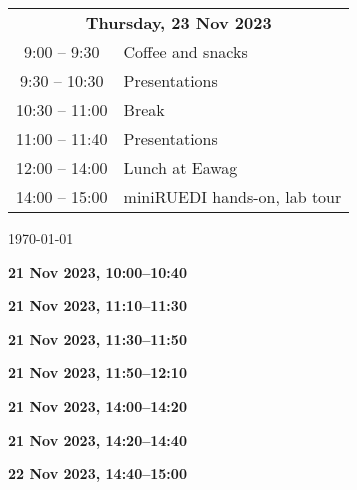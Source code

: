 \documentclass[12pt]{extbook}
\renewcommand{\dateseparator}{--}
\newcommand{\breaktime}[1]{
\bigskip
\begin{center}
\Large\bfseries ***** Break #1 *****
\end{center}
\bigskip}
\renewcommand{\breaktime}[1]{}
\newcommand{\abstract}[2]{{
\bigskip
\begin{center}
\large\bfseries #1
\end{center}}
\par

\clearpage
}
\begin{document}
\begin{center}
\begin{tabular}{c@{\hskip 0.5in}l}
\multicolumn{2}{c}{\bf Thursday, 23 Nov 2023}\\[2ex]
\phantom{1}9:00  -- \phantom{1}9:30	  &	Coffee and snacks\\
\phantom{1}9:30  -- 10:30	&	Presentations\\   %
10:30 -- 11:00	&	Break\\
11:00 -- 11:40	& Presentations\\   %
12:00 -- 14:00	&	Lunch at Eawag\\
14:00 -- 15:00	&	miniRUEDI hands-on, lab tour\\[1.5ex]

\end{tabular}

\enlargethispage{2cm}
\vfill
\renewcommand{\dateseparator}{--}
{\hfill \tiny \today}

\end{center}

\clearpage






\abstract{21 Nov 2023, 10:00--10:40}{abstracts/Giroud} %

\breaktime{30 min}

\abstract{21 Nov 2023, 11:10--11:30}{abstracts/Moeck} %
\abstract{21 Nov 2023, 11:30--11:50}{abstracts/Roques} %
\abstract{21 Nov 2023, 11:50--12:10}{abstracts/Lightfoot} %

\breaktime{ / Lunch}

\abstract{21 Nov 2023, 14:00--14:20}{abstracts/Dutoit} %
\abstract{21 Nov 2023, 14:20--14:40}{abstracts/Strauch_Zimmer} %
\abstract{22 Nov 2023, 14:40--15:00}{abstracts/Wang} %

\breaktime{30 min}
\end{document}
